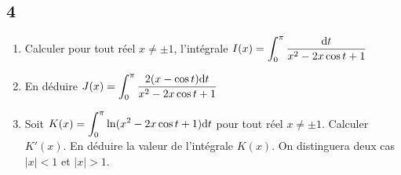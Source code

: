 \documentclass{article}[11pt]
\def \de {{\rm d}}
\begin{document}
\subsection*{4}
\begin{enumerate}
\item Calculer pour tout réel $x\neq \pm1$, l'intégrale $I(x)=\displaystyle \int_{0}^{\pi}\frac{\de t}{x^2-2x\cos t+1}$ 
\item En déduire $J(x)=\displaystyle \int_{0}^{\pi}\frac{2(x-\cos t)\de t}{x^2-2x\cos t+1}$ 
\item Soit $K(x)=\displaystyle \int_{0}^{\pi}\ln(x^2-2x\cos t+1)\de t$ pour tout réel $x\neq \pm1$.  Calculer $K'(x)$. En déduire la valeur de l'intégrale $K(x)$. On distinguera deux cas $|x|<1$ et $|x|>1$.
\end{enumerate}
\end{document}
